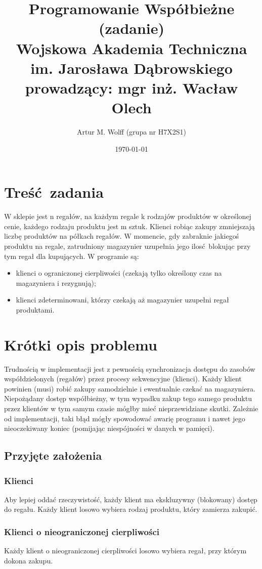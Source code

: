 \documentclass[titlepage]{article}
\title{
	\Large{Programowanie Współbieżne (zadanie)}\normalsize
	\\
	Wojskowa Akademia Techniczna im. Jarosława Dąbrowskiego
	\\
	prowadzący: mgr inż. Wacław Olech
	}
\author{Artur M. Wolff (grupa nr H7X2S1)}
\date{\today}
\begin{document}
\maketitle

\section{Treść zadania}
W sklepie jest n regałów, na każdym regale k rodzajów produktów w określonej cenie, każdego rodzaju produktu jest m sztuk.
Klienci robiąc zakupy zmniejszają liczbę produktów na półkach regałów.
W momencie, gdy zabraknie jakiegoś produktu na regale, zatrudniony magazynier uzupełnia jego ilosć blokując przy tym regał dla kupujących.
W programie są:
\begin{itemize}
	\item klienci o ograniczonej cierpliwości (czekają tylko określony czas na magazyniera i rezygnują);
	\item klienci zdeterminowani, którzy czekają aż magazynier uzupełni regał produktami.
\end{itemize}

\section{Krótki opis problemu}
Trudnością w implementacji jest z pewnością synchronizacja dostępu do zasobów współdzielonych (regałów) przez procesy sekwencyjne (klienci).
Każdy klient powinien (musi) robić zakupy samodzielnie i ewentualnie czekać na magazyniera.
Niepożądany dostęp współbieżny, w tym wypadku zakup tego samego produktu przez klientów w tym samym czasie mógłby mieć nieprzewidziane skutki.
Zależnie od implementacji, taki błąd mógły spowodować awarię programu i nawet jego nieoczekiwany koniec (pomijając niespójności w danych w pamięci).

\subsection{Przyjęte założenia}

\subsubsection{Klienci}
Aby lepiej oddać rzeczywistość, każdy klient ma ekskluzywny (blokowany) dostęp do regału.
Każdy klient losowo wybiera rodzaj produktu, który zamierza zakupić.

\subsubsection{Klienci o nieograniczonej cierpliwości}
Każdy klient o nieograniczonej cierpliwości losowo wybiera regał, przy którym dokona zakupu.
\end{document}
